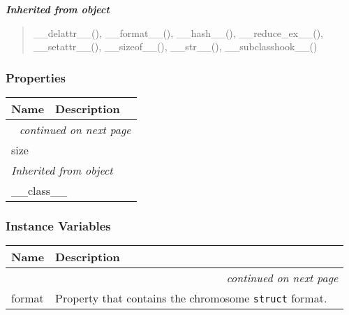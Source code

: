 \large{\textbf{\textit{Inherited from object}}}

\begin{quote}
\_\_delattr\_\_(), \_\_format\_\_(), \_\_hash\_\_(), \_\_reduce\_ex\_\_(), \_\_setattr\_\_(), \_\_sizeof\_\_(), \_\_str\_\_(), \_\_subclasshook\_\_()
\end{quote}


  \subsubsection{Properties}

    \vspace{-1cm}
\hspace{\varindent}\begin{longtable}{|p{\varnamewidth}|p{\vardescrwidth}|l}
\cline{1-2}
\cline{1-2} \centering \textbf{Name} & \centering \textbf{Description}& \\
\cline{1-2}
\endhead\cline{1-2}\multicolumn{3}{r}{\small\textit{continued on next page}}\\\endfoot\cline{1-2}
\endlastfoot\raggedright s\-i\-z\-e\- & &\\
\cline{1-2}
\multicolumn{2}{|l|}{\textit{Inherited from object}}\\
\multicolumn{2}{|p{\varwidth}|}{\raggedright \_\_class\_\_}\\
\cline{1-2}
\end{longtable}



  \subsubsection{Instance Variables}

    \vspace{-1cm}
\hspace{\varindent}\begin{longtable}{|p{\varnamewidth}|p{\vardescrwidth}|l}
\cline{1-2}
\cline{1-2} \centering \textbf{Name} & \centering \textbf{Description}& \\
\cline{1-2}
\endhead\cline{1-2}\multicolumn{3}{r}{\small\textit{continued on next page}}\\\endfoot\cline{1-2}
\endlastfoot\raggedright f\-o\-r\-m\-a\-t\- & Property that contains the chromosome \texttt{struct} format.&\\
\cline{1-2}
\end{longtable}

